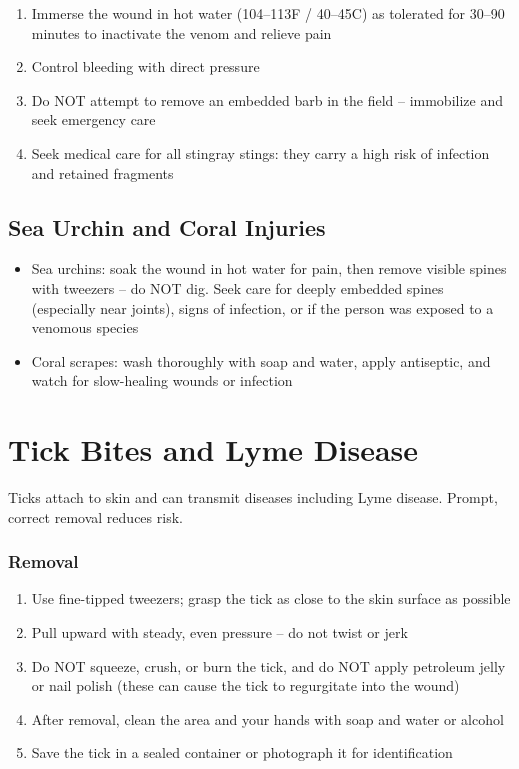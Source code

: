 \begin{enumerate}[leftmargin=*]
\item Immerse the wound in hot water (104--113\textdegree F / 40--45\textdegree C) as tolerated for 30--90 minutes to inactivate the venom and relieve pain
\item Control bleeding with direct pressure
\item Do NOT attempt to remove an embedded barb in the field -- immobilize and seek emergency care
\item Seek medical care for all stingray stings: they carry a high risk of infection and retained fragments
\end{enumerate}
\subsection{Sea Urchin and Coral Injuries}

\begin{itemize}[leftmargin=*]
\item Sea urchins: soak the wound in hot water for pain, then remove visible spines with tweezers -- do NOT dig. Seek care for deeply embedded spines (especially near joints), signs of infection, or if the person was exposed to a venomous species
\item Coral scrapes: wash thoroughly with soap and water, apply antiseptic, and watch for slow-healing wounds or infection
\end{itemize}

\section{Tick Bites and Lyme Disease}

Ticks attach to skin and can transmit diseases including Lyme disease. Prompt, correct removal reduces risk.

\subsubsection{Removal}

\begin{enumerate}[leftmargin=*]
\item Use fine-tipped tweezers; grasp the tick as close to the skin surface as possible
\item Pull upward with steady, even pressure -- do not twist or jerk
\item Do NOT squeeze, crush, or burn the tick, and do NOT apply petroleum jelly or nail polish (these can cause the tick to regurgitate into the wound)
\item After removal, clean the area and your hands with soap and water or alcohol
\item Save the tick in a sealed container or photograph it for identification
\end{enumerate}
